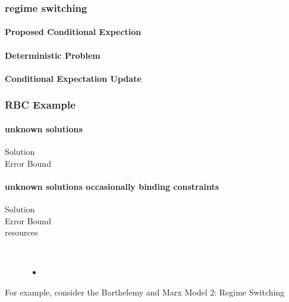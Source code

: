 \documentclass[12pt]{article}
\begin{document}
\subsubsection{regime switching}
\label{sec:regime}

\paragraph{Proposed Conditional Expection}

\paragraph{Deterministic Problem}

\paragraph{Conditional Expectation Update}


\subsubsection{RBC Example}
\label{sec:generalRBCExample}

\paragraph{unknown solutions}
\begin{description}
\item[Solution]
\item[Error Bound]
\end{description}

\paragraph{unknown solutions occasionally binding constraints}
\begin{description}
\item[Solution]
\item[Error Bound]
\item[resources]\
  \begin{itemize}
  \item 
  \end{itemize}
\end{description}



For example,
consider  the Barthelemy and Marx  Model 2: Regime Switching\cite{marxbarthelemy2012}
\end{document}
